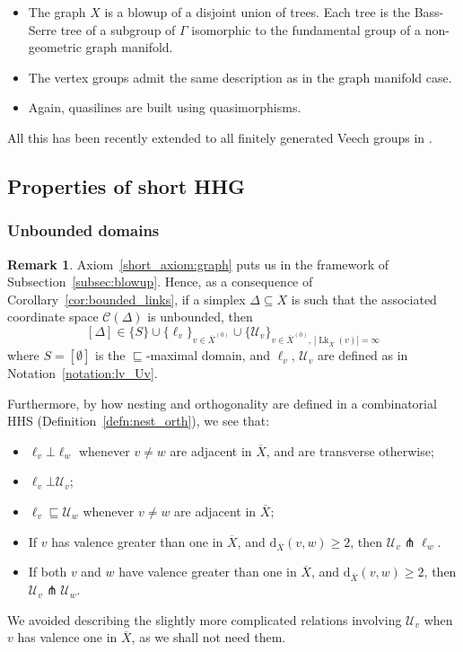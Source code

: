 \documentclass[svgnames]{amsart}
\theoremstyle{plain}
\theoremstyle{definition}
\newtheorem{rem}[thm]{Remark}
\newcommand{\C}{\mathcal C}
\newcommand{\ov}[1]{\overline{#1}}
\newcommand{\U}{\mathcal{U}}
\newcommand{\dist}{\mathrm{d}}
\newcommand{\nest}{\sqsubseteq}
\newcommand{\orth}{\bot}
\newcommand{\transverse}{\pitchfork}
\newcommand{\link}{\operatorname{Lk}}
\begin{document}
\begin{itemize}
    \item The graph $X$ is a blowup of a disjoint union of trees. Each tree is the Bass-Serre tree of a subgroup of $\Gamma$ isomorphic to the fundamental group of a non-geometric graph manifold. 
    \item The vertex groups admit the same description as in the graph manifold case. 
    \item Again, quasilines are built using quasimorphisms.
\end{itemize}

All this has been recently extended to all finitely generated Veech groups in \cite{bongiovanni2024extensions}.


\subsection{Properties of short HHG}
\subsubsection{Unbounded domains}
\begin{rem}\label{rem:unbounded_dom_short_hhg}
    Axiom~\eqref{short_axiom:graph} puts us in the framework of Subsection~\ref{subsec:blowup}. Hence, as a consequence of Corollary~\ref{cor:bounded_links}, if a simplex $\Delta\subseteq X$ is such that the associated coordinate space $\C (\Delta)$ is unbounded, then $$[\Delta]\in\{S\}\cup\{\ell_v\}_{v\in\ov{X}^{(0)}}\cup \{\U_v\}_{v\in\ov{X}^{(0)},\,|\link_{\ov X}(v)|=\infty}$$
    where $S=[\emptyset]$ is the $\nest$-maximal domain, and $\ell_v$, $\U_v$ are defined as in Notation~\ref{notation:lv_Uv}. 
    
    Furthermore, by how nesting and orthogonality are defined in a combinatorial HHS (Definition~\ref{defn:nest_orth}), we see that:
    \begin{itemize}
        \item $\ell_v\orth \ell_w$ whenever $v\neq w$ are adjacent in $\ov X$, and are transverse otherwise; 
        \item $\ell_v\orth \U_v$; 
        \item $\ell_v\nest \U_w$ whenever $v\neq w$ are adjacent in $\ov X$;
        \item If $v$ has valence greater than one in $\ov X$, and $\dist_{\ov X}(v,w)\ge 2$, then $\U_v\transverse \ell_w$.
        \item If both $v$ and $w$ have valence greater than one in $\ov X$, and $\dist_{\ov X}(v,w)\ge 2$, then $\U_v\transverse \U_w$.
    \end{itemize}
    We avoided describing the slightly more complicated relations involving $\U_v$ when $v$ has valence one in $\ov X$, as we shall not need them.
\end{rem}
\end{document}

